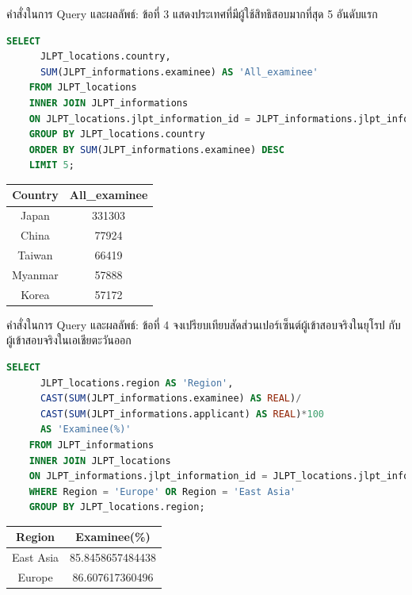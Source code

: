 \documentclass{beamer}
\begin{document}
\begin{frame}[fragile]{คำสั่งในการ Query และผลลัพธ์: ข้อที่ 3}
  แสดงประเทศที่มีผู้ใช้สิทธิสอบมากที่สุด 5 อันดับแรก
  \begin{tiny}
    \begin{lstlisting}[language=SQL]
    SELECT 
      JLPT_locations.country,
      SUM(JLPT_informations.examinee) AS 'All_examinee'
    FROM JLPT_locations
    INNER JOIN JLPT_informations
    ON JLPT_locations.jlpt_information_id = JLPT_informations.jlpt_information_id
    GROUP BY JLPT_locations.country
    ORDER BY SUM(JLPT_informations.examinee) DESC
    LIMIT 5;
    \end{lstlisting}
  \end{tiny}
  \begin{table}[ht]
  \centering
    \begin{tabular}{|c|c|}
      \hline
      \textbf{Country} & \textbf{All\_examinee} \\
      \hline
      Japan & 331303 \\
      China & 77924 \\
      Taiwan & 66419 \\
      Myanmar & 57888 \\
      Korea & 57172 \\
      \hline
    \end{tabular}
  \end{table}
\end{frame}

\begin{frame}[fragile]{คำสั่งในการ Query และผลลัพธ์: ข้อที่ 4}
  จงเปรียบเทียบสัดส่วนเปอร์เซ็นต์ผู้เข้าสอบจริงในยุโรป กับ ผู้เข้าสอบจริงในเอเชียตะวันออก
  \begin{tiny}
    \begin{lstlisting}[language=SQL]
    SELECT 
      JLPT_locations.region AS 'Region',
      CAST(SUM(JLPT_informations.examinee) AS REAL)/
      CAST(SUM(JLPT_informations.applicant) AS REAL)*100 
      AS 'Examinee(%)'
    FROM JLPT_informations
    INNER JOIN JLPT_locations
    ON JLPT_informations.jlpt_information_id = JLPT_locations.jlpt_information_id
    WHERE Region = 'Europe' OR Region = 'East Asia'
    GROUP BY JLPT_locations.region;
    \end{lstlisting}
  \end{tiny}
  \begin{table}[ht]
  \centering
    \begin{tabular}{|c|c|}
      \hline
      \textbf{Region} & \textbf{Examinee(\%)} \\
      \hline
      East Asia & 85.8458657484438 \\
      Europe & 86.607617360496 \\
      \hline
    \end{tabular}
  \end{table}
\end{frame}
\end{document}

